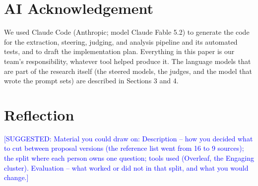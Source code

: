 \documentclass[11pt]{article}
\let\origbibliographystyle
\renewcommand{}[1]{}
\let\origbibliographystyle
\newcommand{\fillin}[1]{\textcolor{red}{[FILL IN: #1]}}
\newcommand{\rec}[1]{\textcolor{blue}{[SUGGESTED: #1]}}
\newcommand{\upd}[1]{{\color{updgreen}#1}}
\begin{document}
\section*{AI Acknowledgement}
\upd{We used Claude Code (Anthropic; model Claude Fable 5.2) to generate the code
for the extraction, steering, judging, and analysis pipeline and its automated
tests, and to draft the implementation plan.}
\upd{Everything in this paper is our team's responsibility, whatever tool helped
produce it.} The language models that are part of the research itself (the steered
models, the judges, and the model that wrote the prompt sets) are described in
Sections 3 and 4.

\section*{Reflection}
\rec{Material you could draw on: Description -- how you decided what to cut between
proposal versions (the reference list went from 16 to 9 sources); the split where
each person owns one question; tools used (Overleaf, the Engaging cluster).
Evaluation -- what worked or did not in that split, and what you would change.}




\appendix
\end{document}
